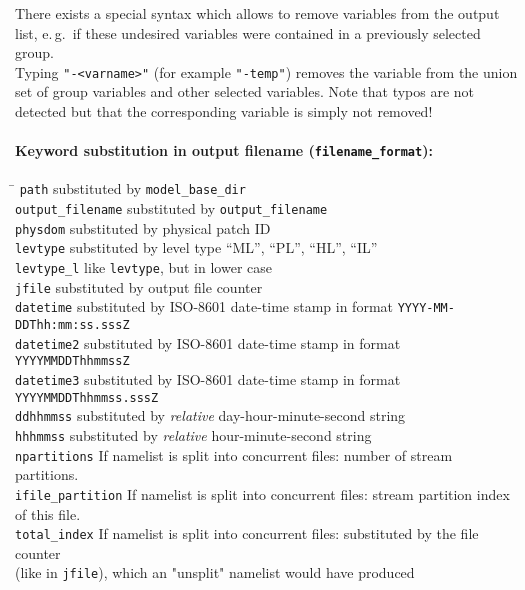 \begin{note}
      There exists a special syntax which allows to remove variables from the output list, e.\,g.\ if
      these undesired variables were contained in a previously selected group.\\
      Typing \texttt{"-\textnormal{<varname>}"} (for example \texttt{"-temp"}) removes the
      variable from the union set of group variables and other selected variables.
      Note that typos are not detected but that the corresponding variable is
      simply not removed!
\end{note}

\paragraph{Keyword substitution in output filename (\texttt{filename\_format}):}
\begin{tabbing}
\hspace*{0.4\textwidth} \= \kill
\texttt{path}              \>  substituted by \texttt{model\_base\_dir}                 \\
\texttt{output\_filename}  \>  substituted by \texttt{output\_filename}                 \\
\texttt{physdom}           \>  substituted by physical patch ID                         \\
\texttt{levtype}           \>  substituted by level type ``ML'', ``PL'', ``HL'', ``IL'' \\
\texttt{levtype\_l}        \>  like \texttt{levtype}, but in lower case                 \\
\texttt{jfile}             \>  substituted by output file counter                       \\
\texttt{datetime}          \>  substituted by ISO-8601 date-time stamp in format \texttt{YYYY-MM-DDThh:mm:ss.sssZ} \\
\texttt{datetime2}         \>  substituted by ISO-8601 date-time stamp in format \texttt{YYYYMMDDThhmmssZ}         \\
\texttt{datetime3}         \>  substituted by ISO-8601 date-time stamp in format \texttt{YYYYMMDDThhmmss.sssZ}     \\
\texttt{ddhhmmss}          \>  substituted by \emph{relative} day-hour-minute-second string \\
\texttt{hhhmmss}           \>  substituted by \emph{relative} hour-minute-second string     \\
\texttt{npartitions}       \>  If namelist is split into concurrent files: number of stream partitions.           \\
\texttt{ifile\_partition}  \>  If namelist is split into concurrent files: stream partition index of this file.   \\
\texttt{total\_index}      \>  If namelist is split into concurrent files: substituted by the file counter \\ 
                           \>  (like in \texttt{jfile}), which an "unsplit" namelist would have produced
\end{tabbing}

